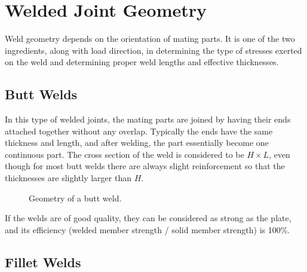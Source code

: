 \documentclass[
10pt,
a4paper,
openany,
svgnames,
]{book}
\begin{document}
\section{Welded Joint Geometry}

Weld geometry depends on the orientation of mating parts. It is one of the two ingredients, along with load direction, in determining the type of stresses exerted on the weld and determining proper weld lengths and effective thicknesses.

\subsection{Butt Welds}
In this type of welded joints, the mating parts are joined by having their ends attached together without any overlap. Typically the ends have the same thickness and length, and after welding, the part essentially become one continuous part. The cross section of the weld is considered to be $H \times L$, even though for most butt welds there are always slight reinforcement so that the thicknesses are slightly larger than $H$.

\begin{figure}[h]
  \centering
  \caption{Geometry of a butt weld.}
\end{figure}
 
If the welds are of good quality, they can be considered as strong as the plate, and its efficiency (welded member strength / solid member strength) is 100\%.

\subsection{Fillet Welds}
\end{document}
